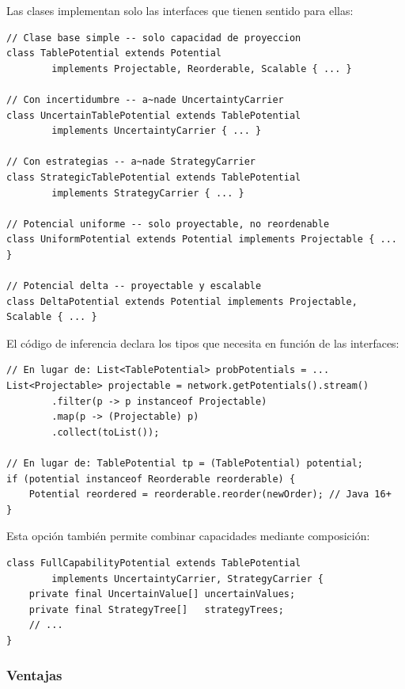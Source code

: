 \documentclass[11pt,a4paper]{article}
\begin{document}
Las clases implementan solo las interfaces que tienen sentido para ellas:

\begin{lstlisting}[caption={Implementación de interfaces por clase}]
// Clase base simple -- solo capacidad de proyeccion
class TablePotential extends Potential
        implements Projectable, Reorderable, Scalable { ... }

// Con incertidumbre -- a~nade UncertaintyCarrier
class UncertainTablePotential extends TablePotential
        implements UncertaintyCarrier { ... }

// Con estrategias -- a~nade StrategyCarrier
class StrategicTablePotential extends TablePotential
        implements StrategyCarrier { ... }

// Potencial uniforme -- solo proyectable, no reordenable
class UniformPotential extends Potential implements Projectable { ... }

// Potencial delta -- proyectable y escalable
class DeltaPotential extends Potential implements Projectable, Scalable { ... }
\end{lstlisting}

El código de inferencia declara los tipos que necesita en función de las
interfaces:

\begin{lstlisting}[caption={Uso de interfaces en el motor de inferencia}]
// En lugar de: List<TablePotential> probPotentials = ...
List<Projectable> projectable = network.getPotentials().stream()
        .filter(p -> p instanceof Projectable)
        .map(p -> (Projectable) p)
        .collect(toList());

// En lugar de: TablePotential tp = (TablePotential) potential;
if (potential instanceof Reorderable reorderable) {
    Potential reordered = reorderable.reorder(newOrder); // Java 16+
}
\end{lstlisting}

Esta opción también permite combinar capacidades mediante composición:

\begin{lstlisting}[caption={Clase que combina múltiples capacidades}]
class FullCapabilityPotential extends TablePotential
        implements UncertaintyCarrier, StrategyCarrier {
    private final UncertainValue[] uncertainValues;
    private final StrategyTree[]   strategyTrees;
    // ...
}
\end{lstlisting}

\subsubsection*{Ventajas}
\end{document}
